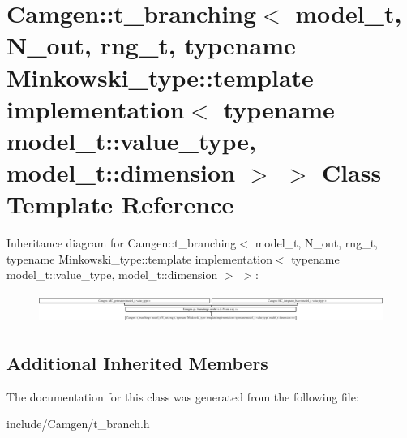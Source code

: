\hypertarget{a00539}{}\section{Camgen\+:\+:t\+\_\+branching$<$ model\+\_\+t, N\+\_\+out, rng\+\_\+t, typename Minkowski\+\_\+type\+:\+:template implementation$<$ typename model\+\_\+t\+:\+:value\+\_\+type, model\+\_\+t\+:\+:dimension $>$ $>$ Class Template Reference}
\label{a00539}
Inheritance diagram for Camgen\+:\+:t\+\_\+branching$<$ model\+\_\+t, N\+\_\+out, rng\+\_\+t, typename Minkowski\+\_\+type\+:\+:template implementation$<$ typename model\+\_\+t\+:\+:value\+\_\+type, model\+\_\+t\+:\+:dimension $>$ $>$\+:\begin{figure}[H]
\begin{center}
\leavevmode
\includegraphics[height=0.943820cm]{a00539}
\end{center}
\end{figure}
\subsection*{Additional Inherited Members}


The documentation for this class was generated from the following file\+:\begin{DoxyCompactItemize}
\item 
include/\+Camgen/t\+\_\+branch.\+h\end{DoxyCompactItemize}
